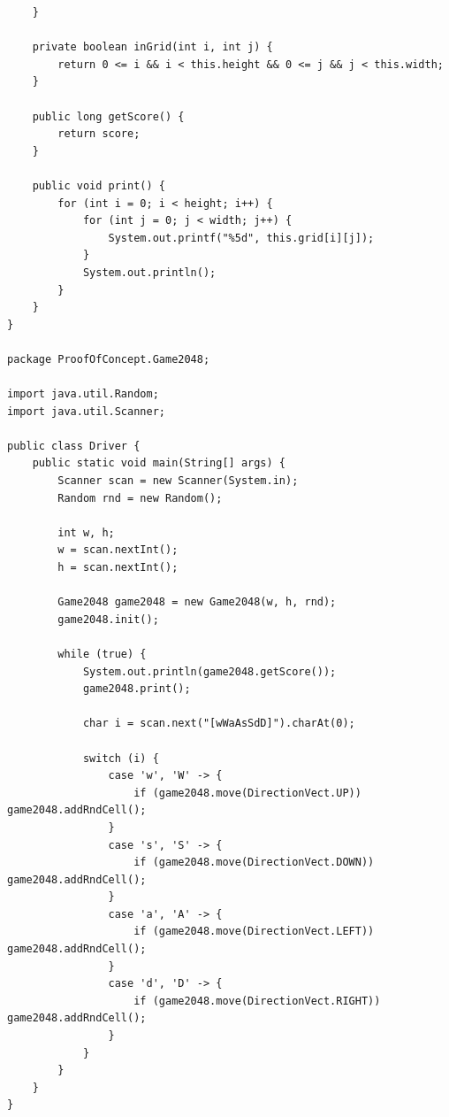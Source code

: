\documentclass{article}
\begin{document}
\begin{verbatim}
    }

    private boolean inGrid(int i, int j) {
        return 0 <= i && i < this.height && 0 <= j && j < this.width;
    }

    public long getScore() {
        return score;
    }

    public void print() {
        for (int i = 0; i < height; i++) {
            for (int j = 0; j < width; j++) {
                System.out.printf("%5d", this.grid[i][j]);
            }
            System.out.println();
        }
    }
}

package ProofOfConcept.Game2048;

import java.util.Random;
import java.util.Scanner;

public class Driver {
    public static void main(String[] args) {
        Scanner scan = new Scanner(System.in);
        Random rnd = new Random();

        int w, h;
        w = scan.nextInt();
        h = scan.nextInt();

        Game2048 game2048 = new Game2048(w, h, rnd);
        game2048.init();

        while (true) {
            System.out.println(game2048.getScore());
            game2048.print();

            char i = scan.next("[wWaAsSdD]").charAt(0);

            switch (i) {
                case 'w', 'W' -> {
                    if (game2048.move(DirectionVect.UP)) game2048.addRndCell();
                }
                case 's', 'S' -> {
                    if (game2048.move(DirectionVect.DOWN)) game2048.addRndCell();
                }
                case 'a', 'A' -> {
                    if (game2048.move(DirectionVect.LEFT)) game2048.addRndCell();
                }
                case 'd', 'D' -> {
                    if (game2048.move(DirectionVect.RIGHT)) game2048.addRndCell();
                }
            }
        }
    }
}


\end{verbatim}
\end{document}
